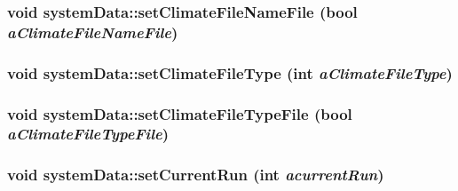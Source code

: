 \label{classsystem_data_a25dd785f92e7e407214d557331296247}
\hypertarget{classsystem_data_a08909586b99e25fec61063e675605fb2}{
\subsubsection[{setClimateFileNameFile}]{\setlength{\rightskip}{0pt plus 5cm}void systemData::setClimateFileNameFile (bool {\em aClimateFileNameFile})}}
\label{classsystem_data_a08909586b99e25fec61063e675605fb2}
\hypertarget{classsystem_data_a53f418d9226592d23e73e355fcd1058a}{
\subsubsection[{setClimateFileType}]{\setlength{\rightskip}{0pt plus 5cm}void systemData::setClimateFileType (int {\em aClimateFileType})}}
\label{classsystem_data_a53f418d9226592d23e73e355fcd1058a}
\hypertarget{classsystem_data_a898e34b6142c7aaf738b80db2a7556d3}{
\subsubsection[{setClimateFileTypeFile}]{\setlength{\rightskip}{0pt plus 5cm}void systemData::setClimateFileTypeFile (bool {\em aClimateFileTypeFile})}}
\label{classsystem_data_a898e34b6142c7aaf738b80db2a7556d3}
\hypertarget{classsystem_data_a3ad4064f55517bdd76aa3d9fd11338a1}{
\subsubsection[{setCurrentRun}]{\setlength{\rightskip}{0pt plus 5cm}void systemData::setCurrentRun (int {\em acurrentRun})}}
